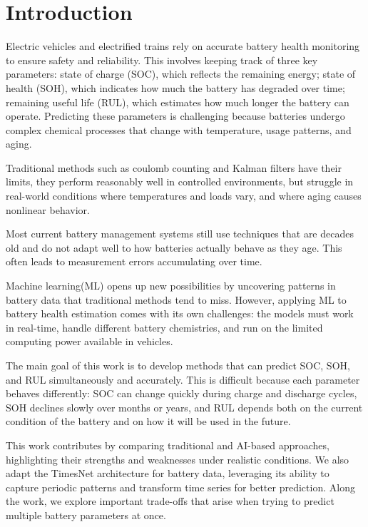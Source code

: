 
\chapter{Introduction}
\label{ch:introduction}

Electric vehicles and electrified trains rely on accurate battery health monitoring to ensure safety and reliability. This involves keeping track of three key parameters: state of charge (SOC), which reflects the remaining energy; state of health (SOH), which indicates how much the battery has degraded over time; remaining useful life (RUL), which estimates how much longer the battery can operate. Predicting these parameters is challenging because batteries undergo complex chemical processes that change with temperature, usage patterns, and aging.

Traditional methods such as coulomb counting and Kalman filters have their limits, they perform reasonably well in controlled environments, but struggle in real-world conditions where temperatures and loads vary, and where aging causes nonlinear behavior.

Most current battery management systems still use techniques that are decades old and do not adapt well to how batteries actually behave as they age. This often leads to measurement errors accumulating over time.

Machine learning(ML) opens up new possibilities by uncovering patterns in battery data that traditional methods tend to miss. However, applying ML to battery health estimation comes with its own challenges: the models must work in real-time, handle different battery chemistries, and run on the limited computing power available in vehicles.

The main goal of this work is to develop methods that can predict SOC, SOH, and RUL simultaneously and accurately. This is difficult because each parameter behaves differently: SOC can change quickly during charge and discharge cycles, SOH declines slowly over months or years, and RUL depends both on the current condition of the battery and on how it will be used in the future.

This work contributes by comparing traditional and AI-based approaches, highlighting their strengths and weaknesses under realistic conditions. We also adapt the TimesNet architecture for battery data, leveraging its ability to capture periodic patterns and transform time series for better prediction. Along the work, we explore important trade-offs that arise when trying to predict multiple battery parameters at once.

